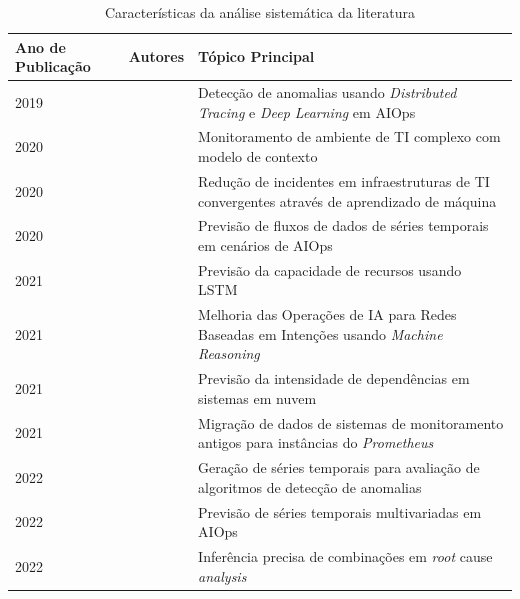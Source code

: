\begin{longtable}{|p{2.5cm}|p{4cm}|p{8cm}|}
\caption{Características da análise sistemática da literatura}
\label{tab:res-anali-sistematica}\\
\hline
\textbf{Ano de Publicação} & \textbf{Autores}         & \textbf{Tópico Principal}                                                                              \\ \hline
\endfirsthead
%
\endhead
%
2019              & \cite{8752866}  & Detecção de anomalias usando \textit{Distributed Tracing} e \textit{Deep Learning} em AIOps                     \\ \hline
2020              & \cite{9156101}  & Monitoramento de ambiente de TI complexo com modelo de contexto                               \\ \hline
2020              & \cite{9311349}  & Redução de incidentes em infraestruturas de TI convergentes através de aprendizado de máquina \\ \hline
2020              & \cite{9443765}  & Previsão de fluxos de dados de séries temporais em cenários de AIOps                          \\ \hline
2021              & \cite{9516546}  & Previsão da capacidade de recursos usando LSTM                                                \\ \hline
2021              & \cite{9605403}  & Melhoria das Operações de IA para Redes Baseadas em Intenções usando \textit{Machine Reasoning}        \\ \hline
2021              & \cite{9678534}  & Previsão da intensidade de dependências em sistemas em nuvem                                  \\ \hline
2021              & \cite{9680514}  & Migração de dados de sistemas de monitoramento antigos para instâncias do \textit{Prometheus}          \\ \hline
2022              & \cite{9492267}  & Geração de séries temporais para avaliação de algoritmos de detecção de anomalias             \\ \hline
2022              & \cite{9746242}  & Previsão de séries temporais multivariadas em AIOps                                           \\ \hline
2022              & \cite{9746416}  & Inferência precisa de combinações em \textit{root} cause \textit{analysis}                                      \\ \hline

\end{longtable}
